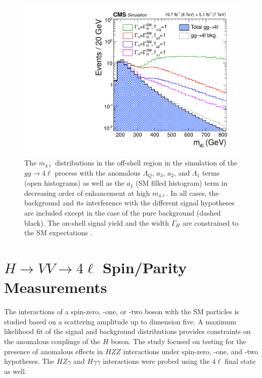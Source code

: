 \begin{figure}
\begin{center}
\centerline{
\includegraphics[width=0.45\linewidth]{Conclusion/cCanvas_MCFMBSM_GenLevel.pdf}
}
\caption[The $m_{4\ell}$ distributions in the off-shell region in the simulation of the $gg \to 4\ell$ process with the 
anomalous $\Lambda_{Q}$, $a_3$, $a_2$, and $\Lambda_{1}$ terms (open histograms) as well as the $a_1$  (SM filled histogram) term in decreasing order of enhancement at high $m_{4\ell}$.
In all cases, the background and its interference with the different signal hypotheses are included except in the case of the pure background (dashed black). The on-shell signal yield and the width $\Gamma_{H}$ are constrained to the SM expectations.]{ The $m_{4\ell}$ distributions in the off-shell region in the simulation of the $gg \to 4\ell$ process with the 
anomalous $\Lambda_{Q}$, $a_3$, $a_2$, and $\Lambda_{1}$ terms (open histograms) as well as the $a_1$  (SM filled histogram) term in decreasing order of enhancement at high $m_{4\ell}$.
In all cases, the background and its interference with the different signal hypotheses are included except in the case of the pure background (dashed black). The on-shell signal yield and the width $\Gamma_{H}$ are constrained to the SM expectations \cite{CMS_AN_2014_247}.
}
\label{fig:reweight_m4l_offshell}
\end{center}
\end{figure}


\section{$H \to VV \to 4\ell$ Spin/Parity Measurements}
\label{sec:Summary_SpinParity}

The interactions of a spin-zero, -one, or -two boson with
the SM particles is studied based on a scattering amplitude up to dimension five. A maximum likelihood fit of the signal and background distributions provides constraints on the anomalous couplings of the $H$ boson. The study focused on testing for the presence of anomalous effects in $HZZ$ interactions under spin-zero, -one, and -two hypotheses. The $HZ\gamma$ and $H\gamma\gamma$  interactions were probed using the $4\ell$ final state as well.


